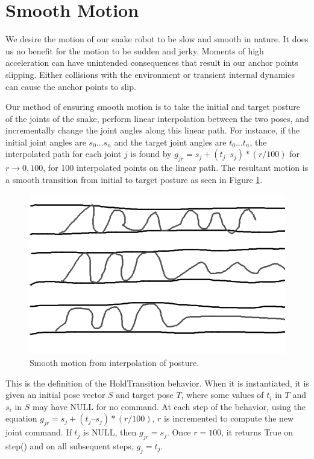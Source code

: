 \section{Smooth Motion}
\label{sec:smooth}

We desire the motion of our snake robot to be slow and smooth in nature.  It does us no benefit for the motion to be sudden and jerky.  Moments of high acceleration can have unintended consequences that result in our anchor points slipping.  Either collisions with the environment or transient internal dynamics can cause the anchor points to slip.

Our method of ensuring smooth motion is to take the initial and target posture of the joints of the snake, perform linear interpolation between the two poses, and incrementally change the joint angles along this linear path.  For instance, if the initial joint angles are ${s_0 ... s_n}$ and the target joint angles are ${t_0 ... t_n}$, the interpolated path for each joint $j$ is found by $g_{jr} = s_j + (t_j – s_j) * (r/100)$ for $r \to {0, 100}$, for 100 interpolated points on the linear path.  The resultant motion is a smooth transition from initial to target posture as seen in Figure \ref{smooth1}.

\begin{figure}
\begin{center}
\includegraphics[scale=0.5]{2_smooth_1.png}
\end{center}
\caption{Smooth motion from interpolation of posture.}
\label{smooth1}
\end{figure}

This is the definition of the HoldTransition behavior.  When it is instantiated, it is given an initial pose vector $S$ and target pose $T$, where some values of $t_i$ in $T$ and $s_i$ in $S$ may have NULL for no command.   At each step of the behavior, using the equation $g_{jr} = s_j + (t_j – s_j) * (r/100)$, $r$ is incremented to compute the new joint command.  If $t_j$ is NULL, then $g_{jr} = s_j$.  Once $r = 100$, it returns True on step() and on all subsequent steps, $g_j = t_j$.


